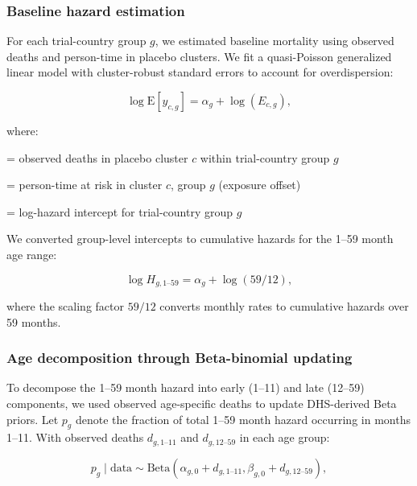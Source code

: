 \documentclass[11pt]{article}\usepackage[]{graphicx}\usepackage[]{xcolor}
\begin{document}
\subsubsection{Baseline hazard estimation}

For each trial-country group $g$, we estimated baseline mortality using observed deaths and person-time in placebo clusters. We fit a quasi-Poisson generalized linear model with cluster-robust standard errors to account for overdispersion:

\begin{equation}
\log \mathrm{E}[y_{c,g}] = \alpha_g + \log(E_{c,g}),
\end{equation}

\noindent where:
\begin{description}[leftmargin=2em]
\item[$y_{c,g}$] = observed deaths in placebo cluster $c$ within trial-country group $g$
\item[$E_{c,g}$] = person-time at risk in cluster $c$, group $g$ (exposure offset)
\item[$\alpha_g$] = log-hazard intercept for trial-country group $g$
\end{description}

We converted group-level intercepts to cumulative hazards for the 1--59 month age range:

\begin{equation}
\log H_{g,1\text{--}59} = \alpha_g + \log(59/12),
\end{equation}

\noindent where the scaling factor $59/12$ converts monthly rates to cumulative hazards over 59 months.

\subsubsection{Age decomposition through Beta-binomial updating}

To decompose the 1--59 month hazard into early (1--11) and late (12--59) components, we used observed age-specific deaths to update DHS-derived Beta priors. Let $p_g$ denote the fraction of total 1--59 month hazard occurring in months 1--11. With observed deaths $d_{g,1\text{--}11}$ and $d_{g,12\text{--}59}$ in each age group:

\begin{equation}
p_g \mid \text{data} \sim \text{Beta}(\alpha_{g,0} + d_{g,1\text{--}11}, \beta_{g,0} + d_{g,12\text{--}59}),
\end{equation}
\end{document}

